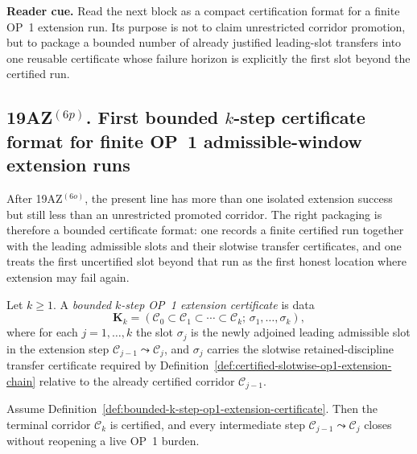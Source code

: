 \noindent\textbf{Reader cue.} Read the next block as a compact certification format for a finite OP~1 extension run. Its purpose is not to claim unrestricted corridor promotion, but to package a bounded number of already justified leading-slot transfers into one reusable certificate whose failure horizon is explicitly the first slot beyond the certified run.

\subsection*{19AZ$^{(6p)}$. First bounded $k$-step certificate format for finite OP~1 admissible-window extension runs}
\label{sec:first-bounded-k-step-certificate-format-for-finite-op1-admissible-window-extension-runs}
After 19AZ$^{(6o)}$, the present line has more than one isolated extension success but still less than an unrestricted promoted corridor. The right packaging is therefore a bounded certificate format: one records a finite certified run together with the leading admissible slots and their slotwise transfer certificates, and one treats the first uncertified slot beyond that run as the first honest location where extension may fail again.

\begin{definition}
\label{def:bounded-k-step-op1-extension-certificate}
Let $k\ge 1$. A \emph{bounded $k$-step OP~1 extension certificate} is data
\[
 \mathbf K_k=(\mathcal C_0\subset\mathcal C_1\subset\cdots\subset\mathcal C_k;\,\sigma_1,\dots,\sigma_k),
\]
where for each $j=1,\dots,k$ the slot $\sigma_j$ is the newly adjoined leading admissible slot in the extension step $\mathcal C_{j-1}\leadsto \mathcal C_j$, and $\sigma_j$ carries the slotwise retained-discipline transfer certificate required by Definition~\ref{def:certified-slotwise-op1-extension-chain} relative to the already certified corridor $\mathcal C_{j-1}$.
\end{definition}

\begin{proposition}
\label{prop:bounded-k-step-certificates-certify-whole-finite-op1-run}
Assume Definition~\ref{def:bounded-k-step-op1-extension-certificate}. Then the terminal corridor $\mathcal C_k$ is certified, and every intermediate step $\mathcal C_{j-1}\leadsto \mathcal C_j$ closes without reopening a live OP~1 burden.
\end{proposition}

